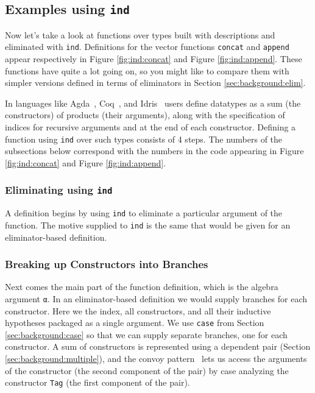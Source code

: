 \documentclass[preprint,nonatbib]{sigplanconf}
\begin{document}
\subsection{Examples using {\tt ind}}

Now let's take a look at functions over types built with descriptions
and eliminated with {\tt ind}. Definitions for the vector functions
{\tt concat} and {\tt append} appear respectively in
Figure \ref{fig:ind:concat} and Figure \ref{fig:ind:append}. These
functions have quite a lot going on, so you might like to compare them with
simpler versions defined in terms of eliminators in
Section \ref{sec:background:elim}.

In languages like
{\sc Agda}~\citep{norell2007towards},
{\sc Coq}~\citep{coq08}, and
{\sc Idris}~\citep{brady2011idris} users define
datatypes as a sum (the constructors) of products (their arguments),
along with the specification of indices for recursive arguments and at
the end of each constructor. Defining a function using {\tt ind} over
such types consists of 4 steps. The numbers of the subsections below
correspond with the numbers in
the code appearing in Figure \ref{fig:ind:concat} and
Figure \ref{fig:ind:append}.

\subsubsection{Eliminating using {\tt ind}}
A definition begins by using {\tt ind} to eliminate a particular
argument of the function. The motive supplied to {\tt ind} is the same
that would be given for an eliminator-based definition.

\subsubsection{Breaking up Constructors into Branches}
Next comes the main part of the function definition, which is the
algebra argument {\tt α}. In an eliminator-based definition we would
supply branches for each constructor. Here we the index, all
constructors, and all their inductive hypotheses packaged as a single
argument. We use {\tt case} from Section
\ref{sec:background:case} so that we can supply separate branches, one
for each constructor. A sum of constructors is represented
using a dependent pair (Section
\ref{sec:background:multiple}), and the convoy
pattern~\citep{TODO} lets us access the arguments of the constructor
(the second component of the pair) by case analyzing the
constructor {\tt Tag} (the first component of the pair).
\end{document}
